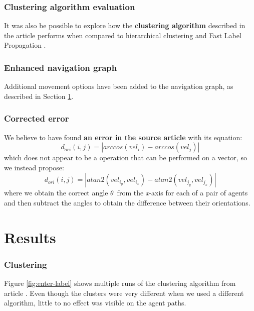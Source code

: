 \documentclass[9pt]{pnas-new}
\begin{document}
\subsubsection{Clustering algorithm evaluation}
It was also be possible to explore how the \textbf{clustering algorithm} described in the article performs when compared to hierarchical clustering and Fast Label Propagation \cite{Lovre_2023}.


\subsubsection{Enhanced navigation graph} Additional movement options have been added to the navigation graph, as described in Section \ref{res}.


\subsubsection{Corrected error}
We believe to have found \textbf{an error in the source article} with its equation: \begin{equation*}
    d_{ori}(i,j)=|arccos(vel_i)-arccos(vel_j)|
\end{equation*}
which does not appear to be a operation that can be performed on a vector, so we instead propose: \begin{equation*}
    d_{ori}(i,j)=|atan2(vel_{i_y},vel_{i_x})-atan2(vel_{j_y},vel_{j_x})|
\end{equation*}
where we obtain the correct angle ${\theta}$\ from the \textit{x}-axis \cite{wikiatan2} for each of a pair of agents and then subtract the angles to obtain the difference between their orientations.

\section{Results} \label{res}
\subsubsection{Clustering}
Figure \ref{fig:enter-label} shows multiple runs of the clustering algorithm from article \cite{Wu_Huang_Tian_Yan_Yu_2024}. Even though the clusters were very different when we used a different algorithm, little to no effect was visible on the agent paths.
\end{document}
